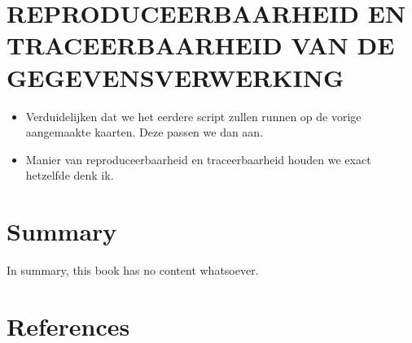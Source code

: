\documentclass[twoside]{extreport}
\providecommand{\tightlist}{%
  \setlength{\itemsep}{0pt}\setlength{\parskip}{0pt}}
\begin{document}

\chapter{REPRODUCEERBAARHEID EN TRACEERBAARHEID VAN DE
GEGEVENSVERWERKING}\label{reproduceerbaarheid-en-traceerbaarheid-van-de-gegevensverwerking}

\begin{itemize}
\tightlist
\item
  Verduidelijken dat we het eerdere script zullen runnen op de vorige
  aangemaakte kaarten. Deze passen we dan aan.
\item
  Manier van reproduceerbaarheid en traceerbaarheid houden we exact
  hetzelfde denk ik.
\end{itemize}


\chapter{Summary}\label{summary}

In summary, this book has no content whatsoever.


\chapter*{References}\label{references}


\protect{}\label{refs}
\end{document}
